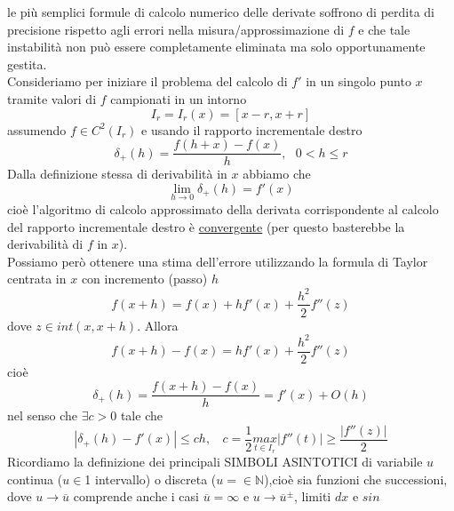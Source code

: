 \documentclass[12pt,a4paper]{article}
\begin{document}
le più semplici formule di calcolo numerico delle derivate soffrono di perdita di precisione rispetto agli errori nella misura/approssimazione di $f$ e che tale instabilità non può essere completamente eliminata ma solo opportunamente gestita.\\Consideriamo per iniziare il problema del calcolo di $f'$ in un singolo punto $x$ tramite valori di $f$ campionati in un intorno 
\begin{equation*}
    I_r=I_r(x)=[x-r,x+r]
\end{equation*}
assumendo $f\in C^2(I_r)$ e usando
il rapporto incrementale destro 
\begin{equation*}
    \delta_+(h)=\frac{f(h+x)-f(x)}{h},\  \  \  0<h\leq r
\end{equation*}
Dalla definizione stessa di derivabilità in $x$ abbiamo che
\begin{equation*}
    \underset{h\rightarrow0}{\lim}\delta_+(h)=f'(x)
\end{equation*}
cioè l'algoritmo di calcolo approssimato della derivata corrispondente al calcolo del rapporto incrementale destro è \underline{convergente} (per questo basterebbe la derivabilità di $f$ in $x$).\\Possiamo però ottenere una
stima dell'errore utilizzando la formula di Taylor centrata in $x$ con incremento (passo) $h$
\begin{equation*}
    f(x+h)=f(x)+hf'(x)+\frac{h^2}{2}f''(z)
\end{equation*}
dove $z\in int(x,x+h)$. Allora
\begin{equation*}
    f(x+h)-f(x)=hf'(x)+\frac{h^2}{2}f''(z)
\end{equation*}
cioè
\begin{equation*}
    \delta_+(h)=\frac{f(x+h)-f(x)}{h}=f'(x)+O(h)
\end{equation*}
nel senso che $\exists c>0$ tale che 
\begin{equation*}
    |\delta_+(h)-f'(x)|\leq ch,\  \  \  \  c=\frac{1}{2}\underset{t\in I_r}{max}|f''(t)|\geq\frac{|f''(z)|}{2}
\end{equation*}
Ricordiamo la definizione dei principali SIMBOLI ASINTOTICI di variabile $u$ continua ($u\in$1 intervallo) o discreta ($u=\in \mathbb{N}$),cioè sia funzioni che successioni, dove $u \rightarrow \overline{u}$ comprende anche i casi $\overline{u}=\infty$ e $u \rightarrow \overline{u}^{\pm}$, limiti $dx$ e $sin$
\end{document}
